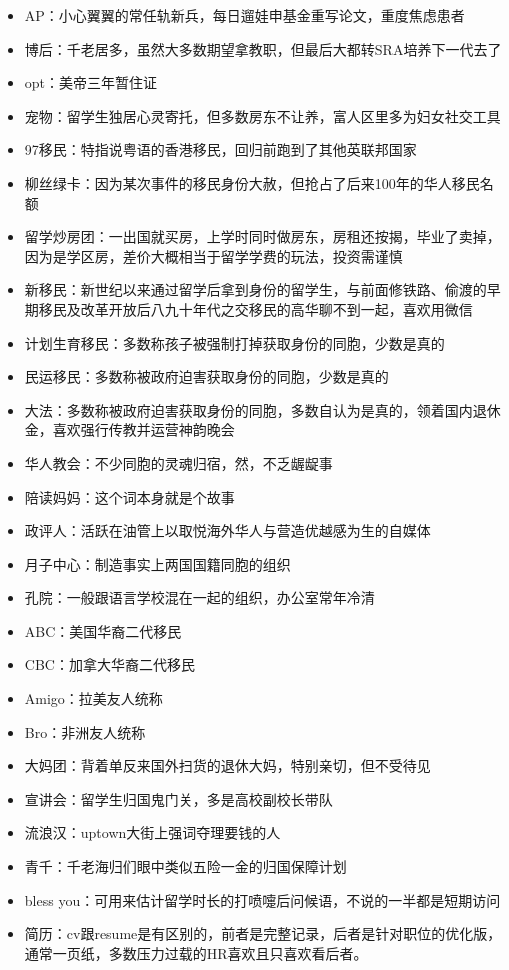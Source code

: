 \documentclass[]{tufte-book}
\begin{document}
\begin{itemize}
\item
  AP：小心翼翼的常任轨新兵，每日遛娃申基金重写论文，重度焦虑患者
\item
  博后：千老居多，虽然大多数期望拿教职，但最后大都转SRA培养下一代去了
\item
  opt：美帝三年暂住证
\item
  宠物：留学生独居心灵寄托，但多数房东不让养，富人区里多为妇女社交工具
\item
  97移民：特指说粤语的香港移民，回归前跑到了其他英联邦国家
\item
  柳丝绿卡：因为某次事件的移民身份大赦，但抢占了后来100年的华人移民名额
\item
  留学炒房团：一出国就买房，上学时同时做房东，房租还按揭，毕业了卖掉，因为是学区房，差价大概相当于留学学费的玩法，投资需谨慎
\item
  新移民：新世纪以来通过留学后拿到身份的留学生，与前面修铁路、偷渡的早期移民及改革开放后八九十年代之交移民的高华聊不到一起，喜欢用微信
\item
  计划生育移民：多数称孩子被强制打掉获取身份的同胞，少数是真的
\item
  民运移民：多数称被政府迫害获取身份的同胞，少数是真的
\item
  大法：多数称被政府迫害获取身份的同胞，多数自认为是真的，领着国内退休金，喜欢强行传教并运营神韵晚会
\item
  华人教会：不少同胞的灵魂归宿，然，不乏龌龊事
\item
  陪读妈妈：这个词本身就是个故事
\item
  政评人：活跃在油管上以取悦海外华人与营造优越感为生的自媒体
\item
  月子中心：制造事实上两国国籍同胞的组织
\item
  孔院：一般跟语言学校混在一起的组织，办公室常年冷清
\item
  ABC：美国华裔二代移民
\item
  CBC：加拿大华裔二代移民
\item
  Amigo：拉美友人统称
\item
  Bro：非洲友人统称
\item
  大妈团：背着单反来国外扫货的退休大妈，特别亲切，但不受待见
\item
  宣讲会：留学生归国鬼门关，多是高校副校长带队
\item
  流浪汉：uptown大街上强词夺理要钱的人
\item
  青千：千老海归们眼中类似五险一金的归国保障计划
\item
  bless you：可用来估计留学时长的打喷嚏后问候语，不说的一半都是短期访问
\item
  简历：cv跟resume是有区别的，前者是完整记录，后者是针对职位的优化版，通常一页纸，多数压力过载的HR喜欢且只喜欢看后者。
\end{itemize}
\end{document}
